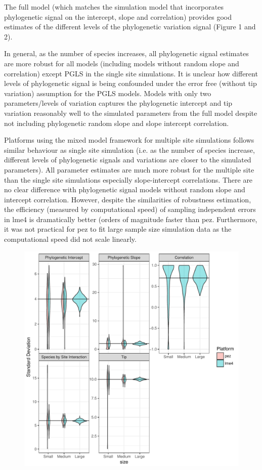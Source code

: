 The full model (which matches the simulation model that incorporates phylogenetic signal on the intercept, slope and correlation) provides good estimates of the different levels of the phylogenetic variation signal (Figure 1 and 2).

In general, as the number of species increases, all phylogenetic signal estimates are more robust for all models (including models without random slope and correlation) except PGLS in the single site simulations. 
It is unclear how different levels of phylogenetic signal is being confounded under the error free (without tip variation) assumption for the PGLS models.
Models with only two parameters/levels of variation captures the phylogenetic intercept and tip variation reasonably well to the simulated parameters from the full model despite not including phylogenetic random slope and slope intercept correlation.

Platforms using the mixed model framework for multiple site simulations follows similar behaviour as single site simulation (i.e. as the number of species increase, different levels of phylogenetic signals and variations are closer to the simulated parameters). 
All parameter estimates are much more robust for the multiple site than the single site simulations especially slope-intercept correlations. 
There are no clear difference with phylogenetic signal models without random slope and intercept correlation.
However, despite the similarities of robustness estimation, the efficiency (measured by computational speed) of sampling independent errors in lme4 is dramatically better (orders of magnitude faster than pez.
Furthermore, it was not practical for pez to fit large sample size simulation data as the computational speed did not scale linearly.

\begin{center}
\begin{figure}[h]
\includegraphics[scale=0.8,page=1]{./csplot.pdf}
\end{figure}
\end{center}

